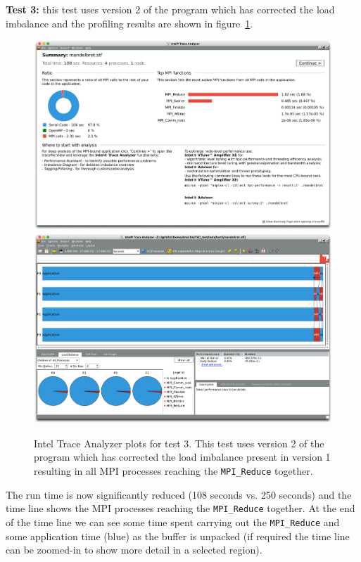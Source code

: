 \documentclass[a4paper,titlepage]{article}
\begin{document}
\noindent
\textbf{Test 3:} this test uses version 2 of the program which has corrected the load imbalance and the profiling results are shown in figure~\ref{fig:test3_ITAC_summary}.
\begin{figure}[htbp]
\begin{center}
\includegraphics[scale=0.3]{figures/test3_summary}
\includegraphics[scale=0.3]{figures/test3_eventTimeline}
\caption{Intel Trace Analyzer plots for test 3. This test uses version 2 of the program which has corrected the load imbalance present in version 1 resulting in all MPI processes reaching the \texttt{MPI\_Reduce} together.}
\label{fig:test3_ITAC_summary}
\end{center}
\end{figure}
The run time is now significantly reduced (108 seconds vs. 250 seconds) and the time line shows the MPI processes reaching the \verb+MPI_Reduce+ together. At the end of the time line we can see some time spent carrying out the \verb+MPI_Reduce+ and some application time (blue) as the buffer is unpacked (if required the time line can be zoomed-in to show more detail in a selected region). \\
\end{document}
